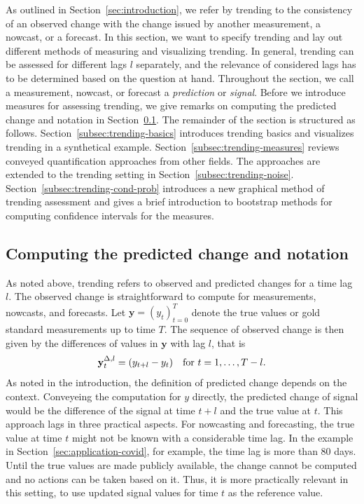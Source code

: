 
As outlined in Section~\ref{sec:introduction}, we refer by trending to the consistency of an observed change with the change issued by another measurement, a nowcast, or a forecast.
In this section, we want to specify trending and lay out different methods of measuring and visualizing trending. 
In general, trending can be assessed for different lags $l$ separately, and the relevance of considered lags has to be determined based on the question at hand.
Throughout the section, we call a measurement, nowcast, or forecast a \textit{prediction} or \textit{signal}.
Before we introduce measures for assessing trending, we give remarks on computing the predicted change and notation in Section~\ref{subsec:notation}.
The remainder of the section is structured as follows.
Section~\ref{subsec:trending-basics} introduces trending basics and visualizes trending in a synthetical example.
Section~\ref{subsec:trending-measures} reviews conveyed quantification approaches from other fields.
The approaches are extended to the trending setting in Section~\ref{subsec:trending-noise}.
Section~\ref{subsec:trending-cond-prob} introduces a new graphical method of trending assessment and gives a brief introduction to bootstrap methods for computing confidence intervals for the measures.

\subsection{Computing the predicted change and notation}\label{subsec:notation}

As noted above, trending refers to observed and predicted changes for a time lag $l$.
The observed change is straightforward to compute for measurements, nowcasts, and forecasts.
Let $\mathbf{y} = (y_t)_{t=0}^T$ denote the true values or gold standard measurements up to time $T$.
The sequence of observed change is then given by the differences of values in $\mathbf{y}$ with lag $l$, that is
\begin{equation}\label{eq:diffy}
    \mathbf{y}^{\Delta,l}_t = (y_{t+l} - y_t) \quad \text{for}\ t = 1, \dots, T - l.
\end{equation}
As noted in the introduction, the definition of predicted change depends on the context.
Conveyeing the computation for $y$ directly, the predicted change of signal would be the difference of the signal at time $t + l$ and the true value at $t$.
This approach lags in three practical aspects.
For nowcasting and forecasting, the true value at time $t$ might not be known with a considerable time lag.
In the example in Section~\ref{sec:application-covid}, for example, the time lag is more than 80 days.
Until the true values are made publicly available, the change cannot be computed and no actions can be taken based on it.
Thus, it is more practically relevant in this setting, to use updated signal values for time $t$ as the reference value.

